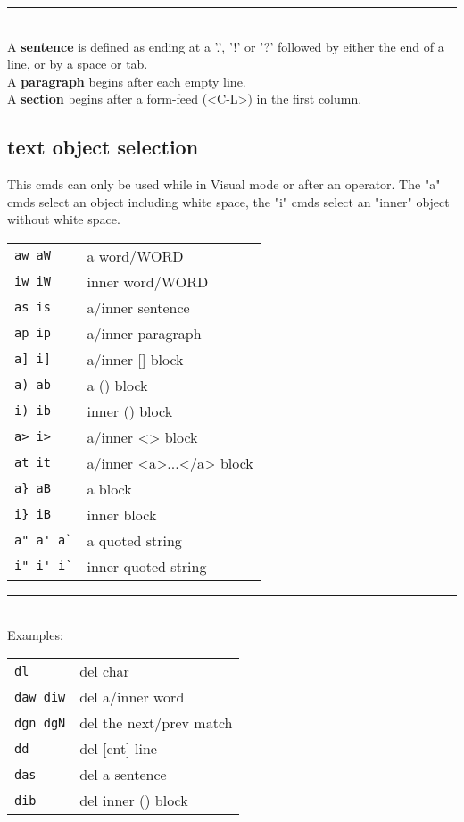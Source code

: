 \hrulefill \noindent\rule{4cm}{0.4pt} \\
A \textbf{sentence} is defined as ending at a '.', '!' or '?' followed by either the end of a line, or by a space or tab. \\
A \textbf{paragraph} begins after each empty line. \\
A \textbf{section} begins after a form-feed (<C-L>) in the first column. \\


\subsection{text object selection}
This cmds can only be used while in Visual mode or after an operator.  The "a" cmds select an object including white space, the "i" cmds select an "inner" object without white space. \\
\begin{tabular}{@{}ll@{}}
    \verb!aw aW!    & a word/WORD \\
    \verb!iw iW!    & inner word/WORD \\
    \verb!as is!    & a/inner sentence \\
    \verb!ap ip!    & a/inner paragraph \\
    \verb!a] i]!    & a/inner [] block \\
    \verb!a) ab!    & a () block \\
    \verb!i) ib!    & inner () block \\
    \verb!a> i>!    & a/inner <> block \\
    \verb!at it!    & a/inner <a>...</a> block \\
    \verb!a} aB!    & a {} block \\
    \verb!i} iB!    & inner {} block \\
    \verb!a" a' a`! & a quoted string \\
    \verb!i" i' i`! & inner quoted string \\
\end{tabular}

\hrulefill \noindent\rule{4cm}{0.4pt} \\
Examples: \\
\begin{tabular}{@{}ll@{}}
    \verb!dl!       & del char \\
    \verb!daw diw!  & del a/inner word \\
    \verb!dgn dgN!  & del the next/prev match \\
    \verb!dd!       & del [cnt] line \\
    \verb!das!      & del a sentence \\
    \verb!dib!      & del inner () block \\
\end{tabular}


